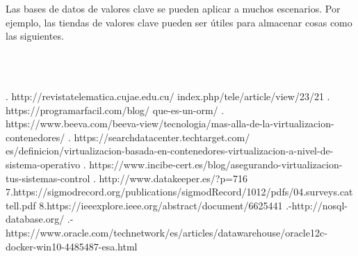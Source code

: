\documentclass[twoside,onecolumn]{article}
\begin{document}
\begin{flushright}
\begin{itemize}
Las bases de datos de valores clave se pueden aplicar a muchos escenarios. Por ejemplo, las tiendas de valores clave pueden ser útiles para almacenar cosas como las siguientes.









\textbf{}\\
\textbf{}\\

\begin{thebibliography}{99} %



. http://revistatelematica.cujae.edu.cu/
index.php/tele/article/view/23/21
 \break
{}. https://programarfacil.com/blog/
que-es-un-orm/
\break
{}. https://www.beeva.com/beeva-view/tecnologia/mas-alla-de-la-virtualizacion-contenedores/
\break
{}. https://searchdatacenter.techtarget.com/
es/definicion/virtualizacion-basada-en-contenedores-virtualizacion-a-nivel-de-sistema-operativo
\break
{}. https://www.incibe-cert.es/blog/asegurando-virtualizacion-tus-sistemas-control
\break
{}. http://www.datakeeper.es/?p=716
\break
\newblock
7.https://sigmodrecord.org/publications/sigmodRecord/1012/pdfs/04.surveys.cattell.pdf
\break
\newblock
8.https://ieeexplore.ieee.org/abstract/document/6625441
\break
{}.-http://nosql-database.org/
\break
{}.-https://www.oracle.com/technetwork/es/articles/datawarehouse/oracle12c-docker-win10-4485487-esa.html
\break
\newblock {\em }
 
\end{thebibliography}



\end{itemize}
\end{flushright}
\end{document}

